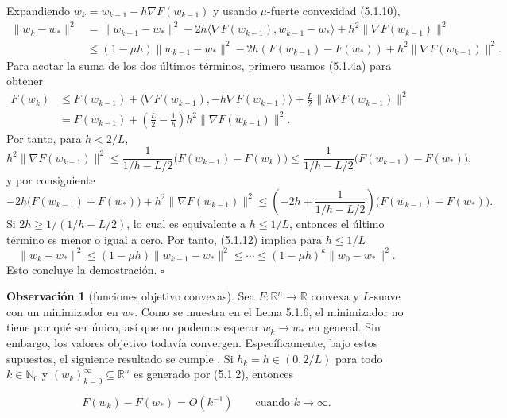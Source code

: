 \documentclass[11pt]{report}
\theoremstyle{definition}
\newtheorem{observacion}[definicion]{Observación}
\theoremstyle{plain}
\numberwithin{equation}{section}
\begin{document}
Expandiendo \(w_k=w_{k-1}-h\nabla F(w_{k-1})\) y usando \(\mu\)-fuerte convexidad (5.1.10),
\begin{align*}
    \|w_k-w_*\|^2
    &=
    \|w_{k-1}-w_*\|^2
    -
    2h\langle\nabla F(w_{k-1}),w_{k-1}-w_*\rangle
    +
    h^2\|\nabla F(w_{k-1})\|^2\\
    &\leq
    (1-\mu h)\|w_{k-1}-w_*\|^2
    -
    2h(F(w_{k-1})-F(w_*))
    +
    h^2\|\nabla F(w_{k-1})\|^2.
    \tag{5.1.12}
\end{align*}
Para acotar la suma de los dos últimos términos, primero usamos (5.1.4a) para obtener
\begin{align*}
    F(w_k)
    &\leq
    F(w_{k-1})
    +
    \langle\nabla F(w_{k-1}),-h\nabla F(w_{k-1})\rangle
    +
    \frac{L}{2}\|h\nabla F(w_{k-1})\|^2\\
    &=
    F(w_{k-1})
    +
    \left(\frac{L}{2}-\frac{1}{h}\right)
    h^2\|\nabla F(w_{k-1})\|^2.
\end{align*}
Por tanto, para \(h<2/L\),
\begin{equation*}
    h^2\|\nabla F(w_{k-1})\|^2
    \leq
    \frac{1}{1/h-L/2}
    \bigl(F(w_{k-1})-F(w_k)\bigr)
    \leq
    \frac{1}{1/h-L/2}
    \bigl(F(w_{k-1})-F(w_*)\bigr),
\end{equation*}
y por consiguiente
\begin{equation*}
    -2h\bigl(F(w_{k-1})-F(w_*)\bigr)
    +
    h^2\|\nabla F(w_{k-1})\|^2
    \leq
    \left(
        -2h+\frac{1}{1/h-L/2}
    \right)
    \bigl(F(w_{k-1})-F(w_*)\bigr).
\end{equation*}
Si \(2h\geq 1/(1/h-L/2)\), lo cual es equivalente a \(h\leq 1/L\), entonces el último término es menor o igual a cero. Por tanto, (5.1.12) implica para \(h\leq 1/L\)
\begin{equation*}
    \|w_k-w_*\|^2
    \leq
    (1-\mu h)\|w_{k-1}-w_*\|^2
    \leq
    \cdots
    \leq
    (1-\mu h)^k\|w_0-w_*\|^2.
\end{equation*}
Esto concluye la demostración. \(\square\)

\begin{observacion}[funciones objetivo convexas]
Sea \(F:\mathbb{R}^n\to\mathbb{R}\) convexa y \(L\)-suave con un minimizador en \(w_*\). Como se muestra en el Lema 5.1.6, el minimizador no tiene por qué ser único, así que no podemos esperar \(w_k\to w_*\) en general. Sin embargo, los valores objetivo todavía convergen. Específicamente, bajo estos supuestos, el siguiente resultado se cumple \cite[Teorema 2.1.14, Corolario 2.1.2]{nesterov-2018}. Si \(h_k=h\in(0,2/L)\) para todo \(k\in\mathbb{N}_0\) y \((w_k)_{k=0}^{\infty}\subseteq\mathbb{R}^n\) es generado por (5.1.2), entonces
\end{observacion}
\begin{equation*}
    F(w_k)-F(w_*)=O(k^{-1})
    \qquad
    \text{cuando } k\to\infty.
\end{equation*}
\end{document}
